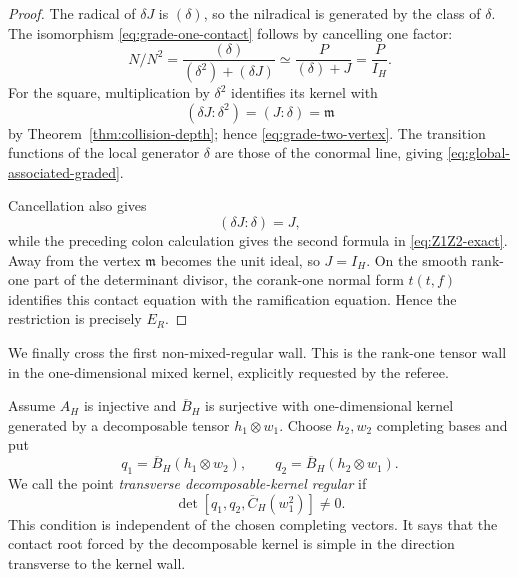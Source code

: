 \begin{proof}
The radical of \(\delta J\) is \((\delta)\), so the nilradical is
generated by the class of \(\delta\).  The isomorphism
\eqref{eq:grade-one-contact} follows by cancelling one factor:
\[
 N/N^2
 =
 \frac{(\delta)}{(\delta^2)+(\delta J)}
 \simeq
 \frac{P}{(\delta)+J}
 =
 \frac{P}{I_H}.
\]
For the square, multiplication by \(\delta^2\) identifies its kernel
with
\[
 (\delta J:\delta^2)=(J:\delta)=\mathfrak m
\]
by Theorem~\ref{thm:collision-depth}; hence
\eqref{eq:grade-two-vertex}.  The transition functions of the local
generator \(\delta\) are those of the conormal line, giving
\eqref{eq:global-associated-graded}.

Cancellation also gives
\[
 (\delta J:\delta)=J,
\]
while the preceding colon calculation gives the second formula in
\eqref{eq:Z1Z2-exact}.  Away from the vertex \(\mathfrak m\) becomes
the unit ideal, so \(J=I_H\).  On the smooth rank-one part of the
determinant divisor, the corank-one normal form
\(t(t,f)\) identifies this contact equation with the ramification
equation.  Hence the restriction is precisely \(E_R\).
\end{proof}

We finally cross the first non-mixed-regular wall.  This is the
rank-one tensor wall in the one-dimensional mixed kernel, explicitly
requested by the referee.

\begin{definition}\label{def:decomposable-kernel-regular}
Assume \(A_H\) is injective and \(\overline B_H\) is surjective with
one-dimensional kernel generated by a decomposable tensor
\(h_1\otimes w_1\).  Choose \(h_2,w_2\) completing bases and put
\[
 q_1=\overline B_H(h_1\otimes w_2),\qquad
 q_2=\overline B_H(h_2\otimes w_1).
\]
We call the point \emph{transverse decomposable-kernel regular} if
\[
 \det[q_1,q_2,\overline C_H(w_1^2)]\ne0.
\]
This condition is independent of the chosen completing vectors.  It
says that the contact root forced by the decomposable kernel is simple
in the direction transverse to the kernel wall.
\end{definition}

